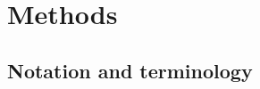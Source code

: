 \documentclass[10pt,twoside,lineno]{gsajnl}
\newcommand{\T}{\mathbb{T}}
\newcommand{\comment}[1]{{\color{violet} \it #1}}
\begin{document}

\section{Methods}

\subsection{Notation and terminology}
\end{document}
